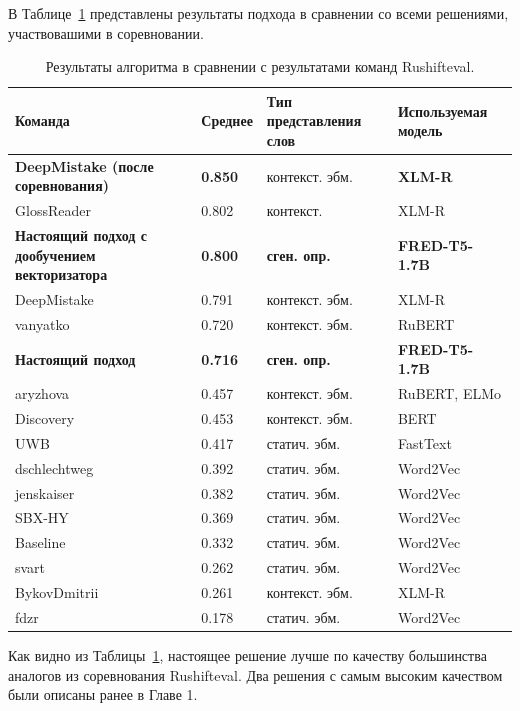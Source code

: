 \documentclass[LI,VKR]{HSEUniversity}
\begin{document}
В Таблице~\ref{tab:Rushifteval all} представлены результаты подхода в сравнении со всеми решениями,
участвовашими в соревновании.

\begin{table}[H]
\centering
\caption{Результаты алгоритма в сравнении с результатами команд Rushifteval.}
\label{tab:Rushifteval all}
\begin{tabular}{|m{4cm}|m{2.5cm}|m{4cm}|m{3cm}|}
\hline
\textbf{Команда} & \textbf{Среднее} & \textbf{Тип представления слов} & \textbf{Используемая модель} \\
\hline
\textbf{DeepMistake (после соревнования)} & \textbf{0.850} & контекст. эбм. & \textbf{XLM-R} \\
\hline
GlossReader & 0.802 & контекст. & XLM-R \\
\hline
\textbf{Настоящий подход с дообучением векторизатора} & \textbf{0.800} & \textbf{сген. опр.} & \textbf{FRED-T5-1.7B} \\
\hline
DeepMistake & 0.791 & контекст. эбм. & XLM-R \\
\hline
vanyatko & 0.720 & контекст. эбм. & RuBERT \\
\hline
\textbf{Настоящий подход} & \textbf{0.716} & \textbf{сген. опр.} & \textbf{FRED-T5-1.7B} \\
\hline
aryzhova & 0.457 & контекст. эбм. & RuBERT, ELMo \\
\hline
Discovery & 0.453 & контекст. эбм. & BERT \\
\hline
UWB & 0.417 & статич. эбм. & FastText \\
\hline
dschlechtweg & 0.392 & статич. эбм. & Word2Vec \\
\hline
jenskaiser & 0.382 & статич. эбм. & Word2Vec \\
\hline
SBX-HY & 0.369 & статич. эбм. & Word2Vec \\
\hline
Baseline & 0.332 & статич. эбм. & Word2Vec \\
\hline
svart & 0.262 & статич. эбм. & Word2Vec \\
\hline
BykovDmitrii & 0.261 & контекст. эбм. & XLM-R \\
\hline
fdzr & 0.178 & статич. эбм. & Word2Vec \\
\hline
\end{tabular}
\end{table}

Как видно из Таблицы~\ref{tab:Rushifteval all}, настоящее решение лучше по качеству
большинства аналогов из соревнования Rushifteval.
Два решения с самым высоким качеством были описаны ранее в Главе 1.
\end{document}
